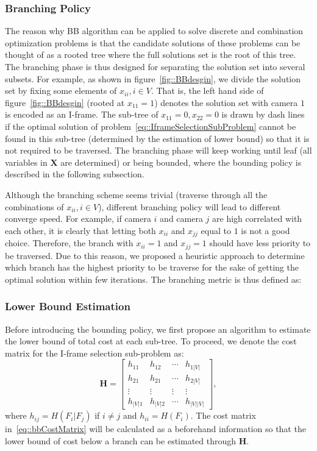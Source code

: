 \subsubsection{Branching Policy}
The reason why BB algorithm can be applied to solve discrete and combination optimization problems is that the candidate solutions of these problems can be thought of as a rooted tree where the full solutions set is the root of this tree.
The branching phase is thus designed for separating the solution set into several subsets.
For example, as shown in figure~\ref{fig::BBdesgin}, we divide the solution set by fixing some elements of ${x_{ii},i \in V}$.
That is, the left hand side of figure~\ref{fig::BBdesgin} (rooted at $x_{11}=1$) denotes the solution set with camera $1$ is encoded as an I-frame.
The sub-tree of $x_{11}=0, x_{22}=0$ is drawn by dash lines if the optimal solution of problem~\eqref{eq::IframeSelectionSubProblem} cannot be found in this sub-tree (determined by the estimation of lower bound) so that it is not required to be traversed.
The branching phase will keep working until leaf (all variables in $\mathbf{X}$ are determined) or being bounded, where the bounding policy is described in the following subsection.

Although the branching scheme seems trivial (traverse through all the combinations of ${x_{ii},i \in V}$), different branching policy will lead to different converge speed.
For example, if camera $i$ and camera $j$ are high correlated with each other, it is clearly that letting both $x_{ii}$ and $x_{jj}$ equal to $1$ is not a good choice.
Therefore, the branch with $x_{ii}=1$ and $x_{jj}=1$ should have less priority to be traversed.
Due to this reason, we proposed a heuristic approach to determine which branch has the highest priority to be traverse for the sake of getting the optimal solution within few iterations.
The branching metric is thus defined as:
%
\subsubsection{Lower Bound Estimation}
Before introducing the bounding policy, we first propose an algorithm to estimate the lower bound of total cost at each sub-tree.
To proceed, we denote the cost matrix for the I-frame selection sub-problem as:
\begin{equation}
\mathbf{H} = \left[ \begin{array}{cccc}
h_{11} &h_{12} &\cdots &h_{1|V|} \\
h_{21} &h_{21} &\cdots &h_{2|V|} \\
\vdots &\vdots &\vdots &\vdots \\
h_{|V|1} &h_{|V|2} &\cdots &h_{|V||V|}
\end{array} \right],
\label{eq::bbCostMatrix}
\end{equation}
where ${h_{ij} = H(F_i|F_j)}$ if ${i \neq j}$ and ${h_{ii}=H(F_i)}$.
The cost matrix in~\eqref{eq::bbCostMatrix} will be calculated as a beforehand information so that the lower bound of cost below a branch can be estimated through $\mathbf{H}$.

